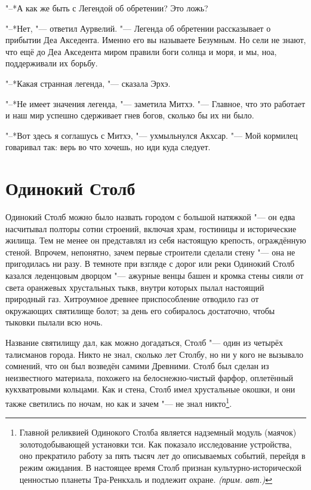 \documentclass[a4paper,10pt]{book}
\newcommand{\authornote}{\textit{(прим. авт.)}}
\begin{document}
"--*А как же быть с Легендой об обретении? Это ложь?

"--*Нет, "--- ответил Аурвелий. "--- Легенда об обретении рассказывает о 
прибытии Деа Акседента. Именно его вы называете Безумным. Но сели не знают, что 
ещё до Деа Акседента миром правили боги солнца и моря, и мы, ноа, поддерживали 
их борьбу.

"--*Какая странная легенда, "--- сказала Эрхэ.

"--*Не имеет значения легенда, "--- заметила Митхэ. "--- Главное, что это 
работает и наш мир успешно сдерживает гнев богов, сколько бы их ни было.

"--*Вот здесь я соглашусь с Митхэ, "--- ухмыльнулся Акхсар. "--- Мой кормилец 
говаривал так: верь во что хочешь, но иди куда следует.

\section{Одинокий Столб}

Одинокий Столб можно было назвать городом с большой натяжкой "--- он едва насчитывал полторы сотни строений, включая храм, гостиницы и исторические жилища.
Тем не менее он представлял из себя настоящую крепость, ограждённую стеной.
Впрочем, непонятно, зачем первые строители сделали стену "--- она не пригодилась ни разу.
В темноте при взгляде с дорог или реки Одинокий Столб казался леденцовым дворцом "--- ажурные венцы башен и кромка стены сияли от света оранжевых хрустальных тыкв, внутри которых пылал настоящий природный газ.
Хитроумное древнее приспособление отводило газ от окружающих святилище болот;
за день его собиралось достаточно, чтобы тыковки пылали всю ночь. 

Название святилищу дал, как можно догадаться, Столб "--- один из четырёх талисманов города.
Никто не знал, сколько лет Столбу, но ни у кого не вызывало сомнений, что он был возведён самими Древними.
Столб был сделан из неизвестного материала, похожего на белоснежно-чистый фарфор, оплетённый кукхватровыми кольцами.
Как и стена, Столб имел хрустальные окошки, и они также светились по ночам, но как и зачем "--- не знал никто\footnote{Главной реликвией Одинокого Столба является надземный модуль (маячок) золотодобывающей установки тси. Как показало исследование устройства, оно прекратило работу за пять тысяч лет до описываемых событий, перейдя в режим ожидания. В настоящее время Столб признан культурно-исторической ценностью планеты Тра-Ренкхаль и подлежит охране. \authornote}.
\end{document}

